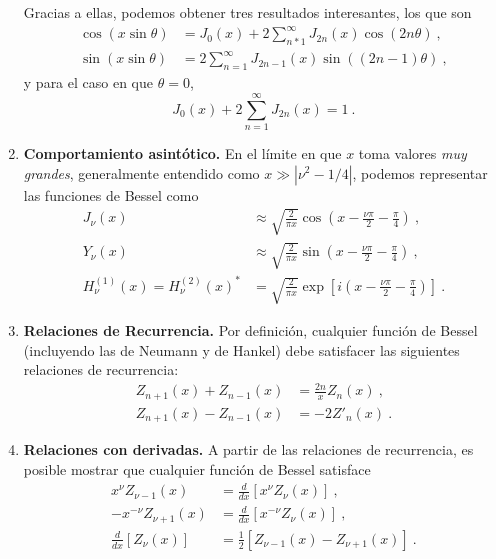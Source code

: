 \begin{propiedad}
\begin{enumerate}
        Gracias a ellas, podemos obtener tres resultados interesantes, los que son 
        \begin{align}
            \cos(x \sin \theta) & = J_0(x) + 2 \sum_{n*1}^\infty J_{2n}(x) \cos(2n\theta) \ , \\
            \sin(x \sin \theta) & = 2 \sum_{n=1}^\infty J_{2n-1}(x) \sin((2n-1)\theta) \ ,
        \end{align}
        y para el caso en que $\theta = 0$, 
        \begin{equation}
            J_0(x) + 2\sum_{n=1}^\infty J_{2n}(x) = 1 \ .
        \end{equation}
        \item \textbf{Comportamiento asintótico.} En el límite en que $x$ toma valores \emph{muy grandes}, generalmente entendido como $x \gg |\nu^2 - 1/4|$, podemos representar las funciones de Bessel como
        \begin{align}
            J_\nu(x) & \approx \sqrt{\frac{2}{\pi x}} \cos\left( x - \frac{\nu \pi}{2} - \frac{\pi}{4} \right) \ , \\
            Y_\nu(x) & \approx \sqrt{\frac{2}{\pi x}} \sin\left( x - \frac{\nu \pi}{2} - \frac{\pi}{4} \right) \ , \\
            H^{(1)}_\nu(x) = H^{(2)}_\nu(x)^\ast & = \sqrt{\frac{2}{\pi x}} \exp\left[ i \left( x - \frac{\nu \pi}{2} - \frac{\pi}{4} \right) \right] \ .
        \end{align}
        \item \textbf{Relaciones de Recurrencia.} Por definición, cualquier función de Bessel (incluyendo las de Neumann y de Hankel) debe satisfacer las siguientes relaciones de recurrencia:
        \begin{align}
            Z_{n+1}(x) + Z_{n-1}(x) & = \frac{2n}{x} Z_n(x) \ , \\
            Z_{n+1}(x) - Z_{n-1}(x) & = -2 Z'_n(x) \ . 
        \end{align}

        \item \textbf{Relaciones con derivadas.} A partir de las relaciones de recurrencia, es posible mostrar que cualquier función de Bessel satisface
        \begin{align}
            x^\nu Z_{\nu-1}(x) & = \frac{d}{dx}\left[ x^\nu Z_\nu(x) \right] \ , \\
            -x^{-\nu} Z_{\nu+1}(x) & = \frac{d}{dx}\left[ x^{-\nu} Z_\nu(x) \right] \ , \\
            \frac{d}{dx} \left[ Z_\nu(x) \right] & = \frac{1}{2} \left[ Z_{\nu-1}(x) - Z_{\nu+1}(x) \right] \ .
        \end{align}
    \end{enumerate}
\end{propiedad}


